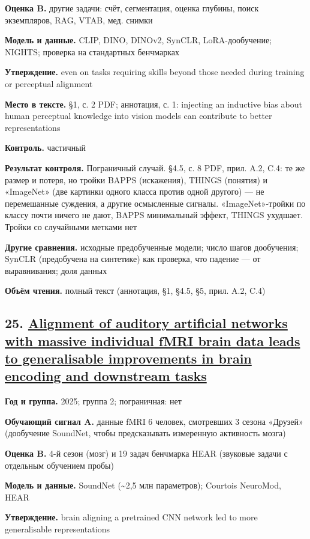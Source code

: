 \textbf{Оценка B.} другие задачи: счёт, сегментация, оценка глубины, поиск экземпляров, RAG, VTAB, мед. снимки

\textbf{Модель и данные.} CLIP, DINO, DINOv2, SynCLR, LoRA-дообучение; NIGHTS; проверка на стандартных бенчмарках

\textbf{Утверждение.} even on tasks requiring skills beyond those needed during training or perceptual alignment

\textbf{Место в тексте.} §1, с. 2 PDF; аннотация, с. 1: injecting an inductive bias about human perceptual knowledge into vision models can contribute to better representations

\textbf{Контроль.} частичный

\textbf{Результат контроля.} Пограничный случай. §4.5, с. 8 PDF, прил. A.2, C.4: те же размер и потеря, но тройки BAPPS (искажения), THINGS (понятия) и «ImageNet» (две картинки одного класса против одной другого) — не перемешанные суждения, а другие осмысленные сигналы. «ImageNet»-тройки по классу почти ничего не дают, BAPPS минимальный эффект, THINGS ухудшает. Тройки со случайными метками нет

\textbf{Другие сравнения.} исходные предобученные модели; число шагов дообучения; SynCLR (предобучена на синтетике) как проверка, что падение — от выравнивания; доля данных

\textbf{Объём чтения.} полный текст (аннотация, §1, §4.5, §5, прил. A.2, C.4)


\subsection*{25. \href{https://doi.org/10.1162/imag_a_00525}{Alignment of auditory artificial networks with massive individual fMRI brain data leads to generalisable improvements in brain encoding and downstream tasks}}

\textbf{Год и группа.} 2025; группа 2; пограничная: нет

\textbf{Обучающий сигнал A.} данные fMRI 6 человек, смотревших 3 сезона «Друзей» (дообучение SoundNet, чтобы предсказывать измеренную активность мозга)

\textbf{Оценка B.} 4-й сезон (мозг) и 19 задач бенчмарка HEAR (звуковые задачи с отдельным обучением пробы)

\textbf{Модель и данные.} SoundNet (\textasciitilde{}2,5 млн параметров); Courtois NeuroMod, HEAR

\textbf{Утверждение.} brain aligning a pretrained CNN network led to more generalisable representations

